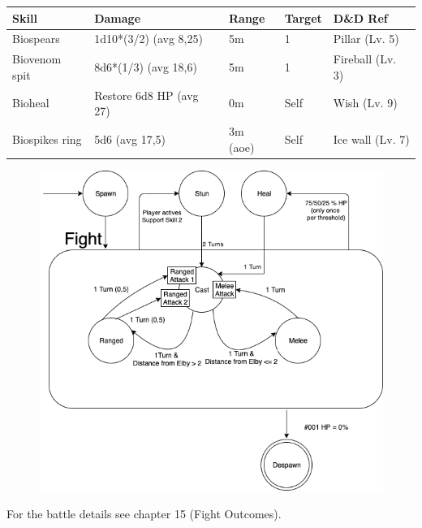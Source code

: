 \begin{center}
	\begin{tabular}[c]{| p{} | p{} | p{2cm} | p{2cm} | p{} | }
		\hline
		\textbf{Skill} & \textbf{Damage} & \textbf{Range} & \textbf{Target} & \textbf{D\&D Ref}\\
		\hline
		Biospears & 1d10*(3/2) (avg 8,25) & 5m & 1 & Pillar (Lv. 5)\\
		\hline
		Biovenom spit & 8d6*(1/3) (avg 18,6) & 5m & 1 & Fireball (Lv. 3)\\
		\hline
		Bioheal & Restore 6d8 HP (avg 27) & 0m & Self & Wish (Lv. 9)\\
		\hline
		Biospikes ring & 5d6 (avg 17,5) & 3m (aoe) & Self & Ice wall (Lv. 7)\\
		\hline
	\end{tabular}
\end{center}
\newpage


\begin{figure}[H]
	\centering
	\includegraphics[width=0.9\linewidth]{images/graphs/fsa/fsa_001.png}
\end{figure}

For the battle details see chapter 15 (Fight Outcomes).
\newpage











